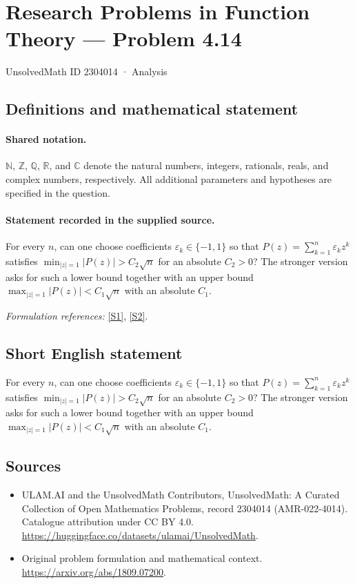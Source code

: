 \documentclass[11pt]{article}
\newcommand{\sref}[2]{\hyperlink{source:#1:#2}{[S#2]}}
\begin{document}
\setcounter{section}{2304013}
\section{Research Problems in Function Theory — Problem 4.14}\label{2304014}
{\small UnsolvedMath ID 2304014 · Analysis}
\subsection{Definitions and mathematical statement}

\paragraph{Shared notation.}$\mathbb N$, $\mathbb Z$, $\mathbb Q$, $\mathbb R$, and $\mathbb C$ denote the natural numbers, integers, rationals, reals, and complex numbers, respectively. All additional parameters and hypotheses are specified in the question.


\paragraph{Statement recorded in the supplied source.}
For every $n$, can one choose coefficients $\varepsilon_k\in\{-1,1\}$ so that $P(z)=\sum_{k=1}^n\varepsilon_kz^k$ satisfies $\min_{|z|=1}|P(z)|>C_2\sqrt n$ for an absolute $C_2>0$? The stronger version asks for such a lower bound together with an upper bound $\max_{|z|=1}|P(z)|<C_1\sqrt n$ with an absolute $C_1$.
\par\smallskip\textit{Formulation references:} \sref{2304014}{1}, \sref{2304014}{2}.
\subsection{Short English statement}
For every $n$, can one choose coefficients $\varepsilon_k\in\{-1,1\}$ so that $P(z)=\sum_{k=1}^n\varepsilon_kz^k$ satisfies $\min_{|z|=1}|P(z)|>C_2\sqrt n$ for an absolute $C_2>0$? The stronger version asks for such a lower bound together with an upper bound $\max_{|z|=1}|P(z)|<C_1\sqrt n$ with an absolute $C_1$.
\subsection{Sources}
\begin{itemize}
\item[\hypertarget{source:2304014:1}{S1}] ULAM.AI and the UnsolvedMath Contributors, UnsolvedMath: A Curated Collection of Open Mathematics Problems, record 2304014 (AMR-022-4014). Catalogue attribution under CC BY 4.0.
\url{https://huggingface.co/datasets/ulamai/UnsolvedMath}.
\item[\hypertarget{source:2304014:2}{S2}] Original problem formulation and mathematical context.
\url{https://arxiv.org/abs/1809.07200}.
\end{itemize}
\label{end:2304014}
\end{document}
